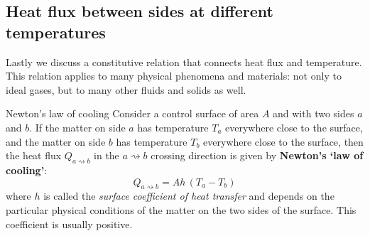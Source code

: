 \documentclass[a4paper,12pt,%
onecolumn,oneside,%
british%
]{memoir}
\renewcommand*{\|}[1][]{\nonscript\:#1\vert\nonscript\:\mathopen{}}
\newcommand*{\yhea}{h} %
\newcommand*{\yQ}{Q}%
\newcommand*{\yT}{T}%
\newcommand*{\yTa}{\yT_{a}}%
\newcommand*{\yTb}{\yT_{b}}%
\begin{document}
\subsection{Heat flux between sides at different temperatures}
\label{sec:heat_flux}

Lastly we discuss a constitutive relation that connects heat flux and temperature. This relation applies to many physical phenomena and materials: not only to ideal gases, but to many other fluids and solids as well.

\begin{definition}{Newton's law of cooling}\label{def:newton_cooling}
  Consider a control surface of area $A$ and with two sides $a$ and $b$. If the matter on side $a$ has temperature $\yTa$ everywhere close to the surface, and the matter on side $b$ has temperature $\yTb$ everywhere close to the surface, then the heat flux $\yQ_{a\rightsquigarrow b}$ in the $a\rightsquigarrow b$ crossing direction is given by \textbf{Newton's \enquote*{law of cooling}}:
\begin{equation}
  \label{eq:newton_cooling}
  \yQ_{a\rightsquigarrow b} = A \yhea\, (\yTa-\yTb)
\end{equation}
where $\yhea$ is called the \emph{surface coefficient of heat transfer} and depends on the particular physical conditions of the matter on the two sides of the surface. This coefficient is usually positive.
\end{definition}
%
%
\end{document}
